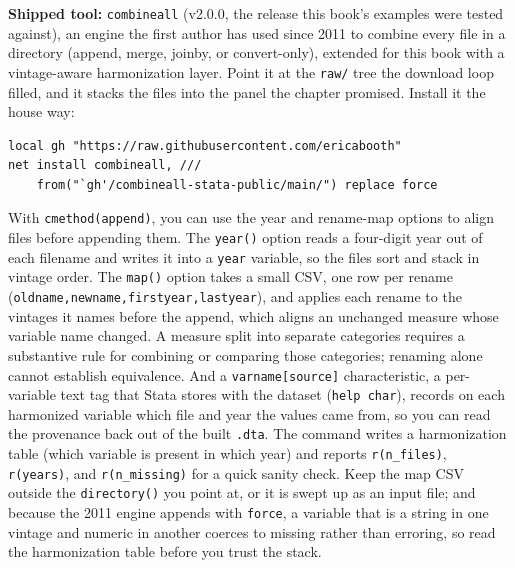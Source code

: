 \documentclass[
    a4paper,
    fontsize=10pt,
    twoside=true,
    numbers=noenddot,
]{kaobook}
\begin{document}
\begin{kaobox}[frametitle=Package Integration: \texttt{combineall}]
\textbf{Shipped tool:} \texttt{combineall} (v2.0.0, the release this book's examples were tested against), an engine the first author has used since 2011 to combine every file in a directory (append, merge, joinby, or convert-only), extended for this book with a vintage-aware harmonization layer. Point it at the \texttt{raw/} tree the download loop filled, and it stacks the files into the panel the chapter promised. Install it the house way:
\par
{\footnotesize
\begin{verbatim}
local gh "https://raw.githubusercontent.com/ericabooth"
net install combineall, ///
    from("`gh'/combineall-stata-public/main/") replace force
\end{verbatim}
}
With \texttt{cmethod(append)}, you can use the year and rename-map options to align files before appending them. The \texttt{year()} option reads a four-digit year out of each filename and writes it into a \texttt{year} variable, so the files sort and stack in vintage order. The \texttt{map()} option takes a small CSV, one row per rename (\texttt{oldname,newname,firstyear,lastyear}), and applies each rename to the vintages it names before the append, which aligns an unchanged measure whose variable name changed. A measure split into separate categories requires a substantive rule for combining or comparing those categories; renaming alone cannot establish equivalence. And a \texttt{varname[source]} characteristic, a per-variable text tag that Stata stores with the dataset (\texttt{help char}), records on each harmonized variable which file and year the values came from, so you can read the provenance back out of the built \texttt{.dta}. The command writes a harmonization table (which variable is present in which year) and reports \texttt{r(n\_files)}, \texttt{r(years)}, and \texttt{r(n\_missing)} for a quick sanity check. Keep the map CSV outside the \texttt{directory()} you point at, or it is swept up as an input file; and because the 2011 engine appends with \texttt{force}, a variable that is a string in one vintage and numeric in another coerces to missing rather than erroring, so read the harmonization table before you trust the stack.
\end{kaobox}
\end{document}
